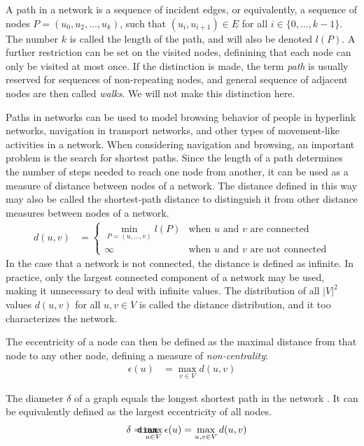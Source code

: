 \documentclass{article}
\def\mathnote#1{%
  \tag*{\rlap{\hspace\marginparsep\smash{\parbox[t]{\marginparwidth}{#1}}}}
}
\begin{document}
A path in a network is a sequence of incident edges, or equivalently, a
sequence of nodes $P = (u_0, u_2, \dotsc, u_k)$, such that $(u_i,
u_{i+1})\in E$ for all $i \in \{0, \dotsc, k-1\}$.  The number $k$ is
called the length of the path, and will also be denoted $l(P)$.  A
further restriction can be set on the visited nodes, definining that
each node can only be visited at most once. If the distinction is made,
the term \emph{path} is usually reserved for sequences of non-repeating
nodes, and general sequence of adjacent nodes are then called
\emph{walks}.  We will not make this distinction here.

Paths in networks can be used to model browsing behavior of people in
hyperlink networks, navigation in transport networks, and other types of
movement-like activities in a network.  When considering navigation and
browsing, an important problem is the search for shortest paths.  Since
the length of a path determines the number of steps needed to reach one
node from another, it can be used as a measure of distance between nodes
of a network.  The distance defined in this way may also be called the
shortest-path distance to distinguish it from other distance measures
between nodes of a network.
\begin{align}
  d(u, v) &= \left\{ \begin{array} {ll} \min_{P=(u, \dotsc, v)} l(P) &
    \text{when $u$ and $v$ are connected} \\ \infty & \text{when $u$ and
      $v$ are not connected}
  \end{array} \right. 
\end{align}
In the case that a network is not connected, the distance is defined as
infinite.  In practice, only the largest connected component of a
network may be used, making it unnecessary to deal with infinite values.
The distribution of all $|V|^2$ values $d(u,v)$ for all $u,v\in V$ is
called the distance distribution, and it too characterizes the network.

The eccentricity of a node can then be defined as the maximal distance
from that node to any other node, defining a measure of
\emph{non-centrality}:
\begin{align}
  \epsilon(u) &= \max_{v\in V} d(u,v)
\end{align}

The diameter $\delta$ of a graph equals the longest shortest path in the
network \citep{b779}.  It can be equivalently defined as the largest eccentricity of
all nodes.
\begin{align}
  \mathnote{\texttt{diam}} \delta &= \max_{u \in V} \epsilon(u) =
  \max_{u,v \in V} d(u,v)
\end{align}
\end{document}
